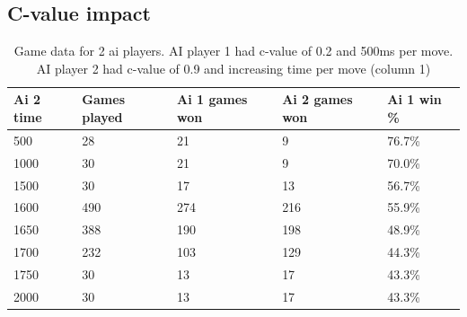 \documentclass[
11pt, %
english, %
singlespacing, %
headsepline, %
]{MastersDoctoralThesis} %
\begin{document}
\begin{appendices}
\section{C-value impact}
\begin{table}[H]
	\begin{tabular}{|l||l|l|l|l|}
		\hline
		Ai 2 time & Games played & Ai 1 games won & Ai 2 games won & Ai 1 win \% \\ \hline \hline
		500       & 28           & 21             & 9              & 76.7\%      \\ \hline
		1000      & 30           & 21             & 9              & 70.0\%      \\ \hline
		1500      & 30           & 17             & 13             & 56.7\%      \\ \hline
		1600      & 490          & 274            & 216            & 55.9\%      \\ \hline
		1650      & 388          & 190            & 198            & 48.9\%      \\ \hline
		1700      & 232          & 103            & 129            & 44.3\%      \\ \hline
		1750      & 30           & 13             & 17             & 43.3\%      \\ \hline
		2000      & 30           & 13             & 17             & 43.3\%      \\ \hline
	\end{tabular}
	\centering
	\caption{Game data for 2 ai players. AI player 1 had c-value of 0.2 and 500ms per move. AI player 2 had c-value of 0.9 and increasing time per move (column 1)}
	\label{table:impact-02-09}
\end{table}

\end{appendices}
\end{document}

